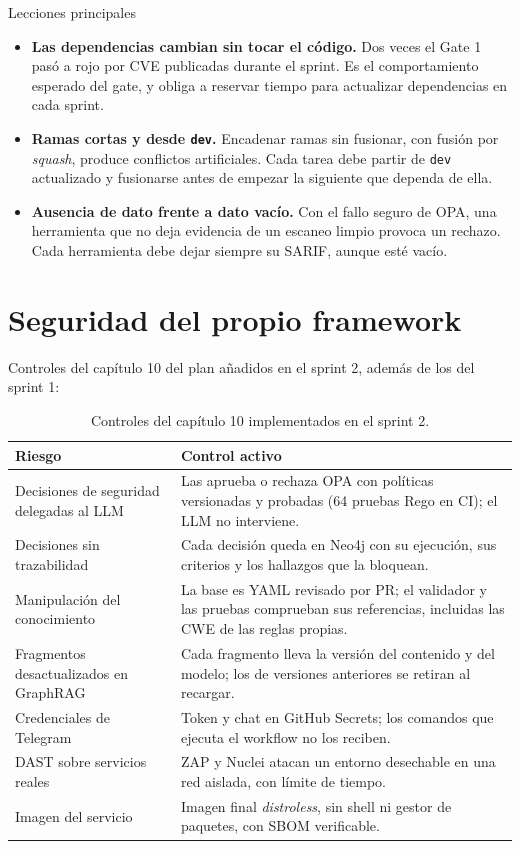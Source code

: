 \documentclass[11pt,a4paper]{report}
\begin{document}
\begin{cajaocre}{Lecciones principales}
\begin{itemize}[leftmargin=1.2em]
\item \textbf{Las dependencias cambian sin tocar el código.} Dos veces el Gate 1 pasó a rojo por
CVE publicadas durante el sprint. Es el comportamiento esperado del gate, y obliga a reservar
tiempo para actualizar dependencias en cada sprint.
\item \textbf{Ramas cortas y desde \texttt{dev}.} Encadenar ramas sin fusionar, con fusión por
\emph{squash}, produce conflictos artificiales. Cada tarea debe partir de \texttt{dev}
actualizado y fusionarse antes de empezar la siguiente que dependa de ella.
\item \textbf{Ausencia de dato frente a dato vacío.} Con el fallo seguro de OPA, una herramienta
que no deja evidencia de un escaneo limpio provoca un rechazo. Cada herramienta debe dejar siempre
su SARIF, aunque esté vacío.
\end{itemize}
\end{cajaocre}

\chapter{Seguridad del propio framework}

Controles del capítulo 10 del plan añadidos en el sprint 2, además de los del sprint 1:

\begin{table}[H]
\centering
\caption{Controles del capítulo 10 implementados en el sprint 2.}
\begin{tabularx}{\textwidth}{@{}P{4.2cm}L@{}}
\toprule
\textbf{Riesgo} & \textbf{Control activo}\\
\midrule
Decisiones de seguridad delegadas al LLM & Las aprueba o rechaza OPA con políticas versionadas y probadas (64 pruebas Rego en CI); el LLM no interviene.\\
Decisiones sin trazabilidad & Cada decisión queda en Neo4j con su ejecución, sus criterios y los hallazgos que la bloquean.\\
Manipulación del conocimiento & La base es YAML revisado por PR; el validador y las pruebas comprueban sus referencias, incluidas las CWE de las reglas propias.\\
Fragmentos desactualizados en GraphRAG & Cada fragmento lleva la versión del contenido y del modelo; los de versiones anteriores se retiran al recargar.\\
Credenciales de Telegram & Token y chat en GitHub Secrets; los comandos que ejecuta el workflow no los reciben.\\
DAST sobre servicios reales & ZAP y Nuclei atacan un entorno desechable en una red aislada, con límite de tiempo.\\
Imagen del servicio & Imagen final \emph{distroless}, sin shell ni gestor de paquetes, con SBOM verificable.\\
\bottomrule
\end{tabularx}
\end{table}
\end{document}
